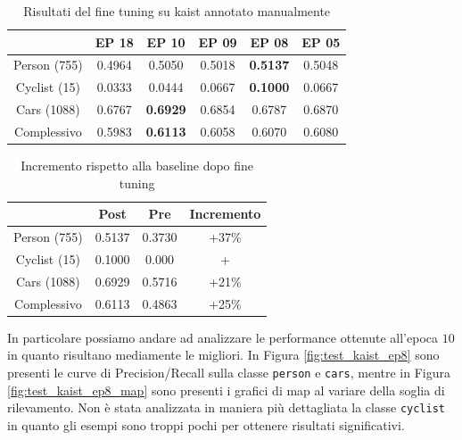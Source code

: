 \begin{table}[]
    \centering
    \begin{tabular}{c|c|c|c|c|c|}
    \cline{2-6}
     & EP 18 & EP 10 & EP 09 & EP 08 & EP 05 \\ \hline
    \multicolumn{1}{|c|}{Person (755)} & 0.4964 & 0.5050 & 0.5018 & \textbf{0.5137} & 0.5048 \\ \hline
    \multicolumn{1}{|c|}{Cyclist (15)} & 0.0333 & 0.0444 & 0.0667 & \textbf{0.1000} & 0.0667 \\ \hline
    \multicolumn{1}{|c|}{Cars (1088)} & 0.6767 & \textbf{0.6929} & 0.6854 & 0.6787 & 0.6870 \\ \hline
    \multicolumn{1}{|c|}{Complessivo} & 0.5983 & \textbf{0.6113} & 0.6058 & 0.6070 & 0.6080 \\ \hline
    \end{tabular}
    \caption{Risultati del fine tuning su kaist annotato manualmente}
    \label{tab:fine_tuning_kaist_flir}
\end{table}
\begin{table}[]
    \centering
    \begin{tabular}{c|c|c|c|}
    \cline{2-4}
     & Post & Pre & Incremento \\ \hline
    \multicolumn{1}{|c|}{Person (755)} & 0.5137 & 0.3730 & +37\% \\ \hline
    \multicolumn{1}{|c|}{Cyclist (15)} & 0.1000 & 0.000 & + \\ \hline
    \multicolumn{1}{|c|}{Cars (1088)} & 0.6929 & 0.5716 & +21\% \\ \hline
    \multicolumn{1}{|c|}{Complessivo} & 0.6113 & 0.4863 & +25\% \\ \hline
    \end{tabular}
    \caption{Incremento rispetto alla baseline dopo fine tuning}
    \label{tab:fine_tuning_kaist_flir_increment}
\end{table}

In particolare possiamo andare ad analizzare le performance ottenute all'epoca $10$ in quanto risultano mediamente le migliori. In Figura \ref{fig:test_kaist_ep8} sono presenti le curve di Precision/Recall sulla classe \texttt{person} e \texttt{cars}, mentre in Figura \ref{fig:test_kaist_ep8_map} sono presenti i grafici di \ac{map} al variare della soglia di rilevamento. Non è stata analizzata in maniera più dettagliata la classe \texttt{cyclist} in quanto gli esempi sono troppi pochi per ottenere risultati significativi. 

